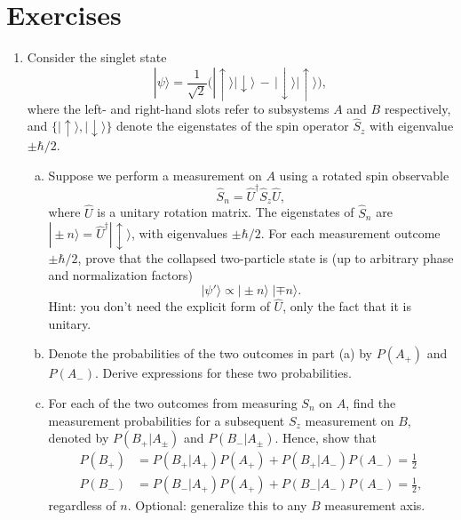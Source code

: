 \documentclass[pra,12pt]{revtex4-2}
\begin{document}
\section*{Exercises}

\begin{enumerate}

\item \label{ex:singletproperties}
Consider the singlet state
\begin{equation}
  |\psi\rangle = \frac{1}{\sqrt{2}} \Big(|\!\uparrow\rangle|\!\downarrow\rangle \,-\, |\!\downarrow\rangle|\!\uparrow\rangle\Big),
\end{equation}
where the left- and right-hand slots refer to subsystems $A$ and $B$
respectively, and $\{|\!\uparrow\rangle, |\!\downarrow\rangle\}$
denote the eigenstates of the spin operator $\hat{S}_z$ with
eigenvalue $\pm\hbar/2$.
\begin{enumerate}[(a)]
\item Suppose we perform a measurement on $A$ using a rotated spin
  observable
\begin{equation}
  \hat{S}_n = \hat{U}^\dagger \hat{S}_z \hat{U},
\end{equation}
where $\hat{U}$ is a unitary rotation matrix.  The eigenstates of
$\hat{S}_n$ are $|\!\pm n\rangle = \hat{U}^\dagger |\!\updownarrow\rangle$, with
eigenvalues $\pm \hbar/2$.  For each measurement outcome $\pm\hbar/2$,
prove that the collapsed two-particle state is (up to arbitrary phase
and normalization factors)
\begin{equation}
  |\psi'\rangle \propto |\pm \!n \rangle\; |\mp\! n\rangle.
\end{equation}
Hint: you don't need the explicit form of $\hat{U}$, only the fact
that it is unitary.

\item Denote the probabilities of the two outcomes in part (a) by
  $P(A_+)$ and $P(A_-)$.  Derive expressions for these two
  probabilities.

\item For each of the two outcomes from measuring $S_n$ on $A$, find
  the measurement probabilities for a subsequent $S_z$ measurement on
  $B$, denoted by $P(B_+|A_\pm)$ and $P(B_-|A_\pm)$.  Hence, show that
  \begin{align}
    P(B_+) &= P(B_+|A_+) P(A_+) + P(B_+|A_-) P(A_-) = \frac{1}{2}\\
    P(B_-) &= P(B_-|A_+) P(A_+) + P(B_-|A_-) P(A_-) = \frac{1}{2},
  \end{align}
  regardless of $n$.  Optional: generalize this to any $B$ measurement
  axis.


\end{enumerate}
\end{enumerate}
\end{document}
